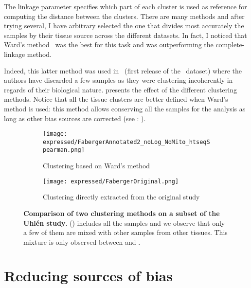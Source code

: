 The linkage parameter specifies which part of each cluster is used as reference
for computing the distance between the clusters. There are many methods and after
trying several, I have arbitrary selected the one that divides most accurately
the samples by their tissue source across the different datasets.
In fact, I noticed that Ward's method~
was the best for this task and was outperforming the complete-linkage method.

Indeed, this latter method was used in~
(first release of the \uhlen\ dataset) where
the authors have discarded a few samples as they were clustering
incoherently in regards of their biological nature.
 presents the effect of the different clustering
methods.
Notice that all the tissue clusters are better defined when Ward's
method is used:
this method allows conserving all the samples for the analysis
as long as other bias sources are corrected (see : ).
\begin{figure}[!htpb]
    \centering
       \begin{subfigure}[hp]{0.70\textwidth}
       \centering \texttt{[image: expressed/FabergerAnnotated2\_noLog\_NoMito\_htseqSpearman.png]}
    \caption{Clustering based on Ward's method}\label{fig:FabergerRedone}
   \end{subfigure}

     \begin{subfigure}[hp]{0.70\textwidth}
      \centering \texttt{[image: expressed/FabergerOriginal.png]}
      \caption{Clustering directly extracted from the original study
      {\footnotesize {}}}\label{fig:fabergerOriginal}
       \end{subfigure}
    \caption[Comparison of two clustering methods on a subset of the \uhlen\ study]{%
    \textbf{Comparison of two clustering methods on a subset of the Uhlén study}.
    () includes all the samples and
    we observe that only a few of them are mixed with other samples from other tissues.
    This mixture is only observed between  and .
 }\label{fig:versusFaberger}
\end{figure}

\section{Reducing sources of bias}\label{sec:bias_sources}

